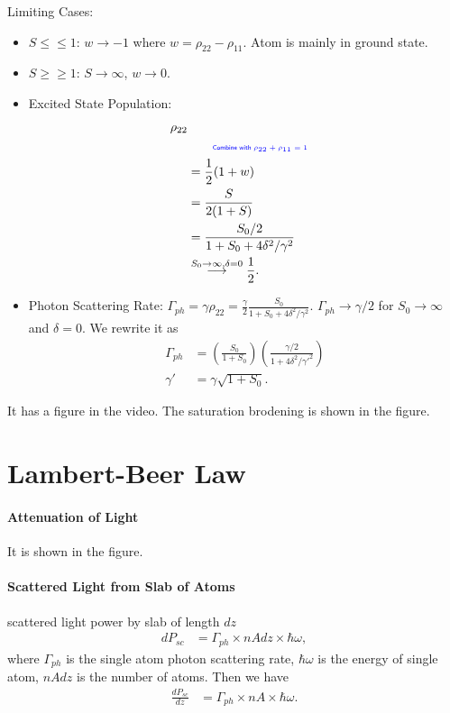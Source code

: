 \documentclass[../../note.tex]{subfiles}
\begin{document}
Limiting Cases: 
\begin{itemize}
    \item $S \leq \leq 1$: $w \rightarrow -1$ where $w = \rho_{22} - \rho_{11}$. Atom is mainly in ground state.
    \item $S \geq\geq 1$: $S \rightarrow \infty$, $w \rightarrow 0$.
\end{itemize}

\begin{itemize}
    \item Excited State Population: 
    \begin{align}
        \rho_{22} \\
        &\qquad\text{\color{blue}{\tiny\sffamily Combine with $\rho_{22} + \rho_{11} = 1$}} \nonumber \\
        &= \frac{1}{2} (1+w) \\
        &= \frac{S}{2(1+S)} \\
        &= \frac{S_0/2}{1+S_0+4 \delta^2/\gamma^2} \\
        &\stackrel{S_0 \rightarrow \infty, \delta = 0}{\longrightarrow} \frac{1}{2}.
    \end{align}
    \item Photon Scattering Rate: $\Gamma_{ph} = \gamma \rho_{22} = \frac{\gamma}{2} \frac{S_0}{1+S_0+4 \delta^2/\gamma^2}$. $\Gamma_{ph} \rightarrow \gamma/2$ for $S_0 \rightarrow \infty$ and $\delta = 0$. We rewrite it as
    \begin{align}
        \Gamma_{ph}
        &= \left(\frac{S_0}{1+S_0}\right)\left(\frac{\gamma/2}{1+4 \delta^2 / \gamma'^2}\right) \\
        \gamma'
        &= \gamma \sqrt{1+S_0}.
    \end{align} 
\end{itemize}
It has a figure in the video. The saturation brodening is shown in the figure.

\section{Lambert-Beer Law}
\paragraph{Attenuation of Light}
It is shown in the figure.

\paragraph{Scattered Light from Slab of Atoms}
scattered light power by slab of length $d z$
\begin{align}
    d P_{sc}
    &= \Gamma_{ph} \times n A dz \times \hbar \omega,
\end{align}
where $\Gamma_{ph}$ is the single atom photon scattering rate, $\hbar \omega$ is the energy of single atom, $n A d z$ is the number of atoms. Then we have
\begin{align}
    \frac{d P_{sc}}{d z}
    &= \Gamma_{ph} \times nA \times \hbar \omega.
\end{align}
\end{document}
